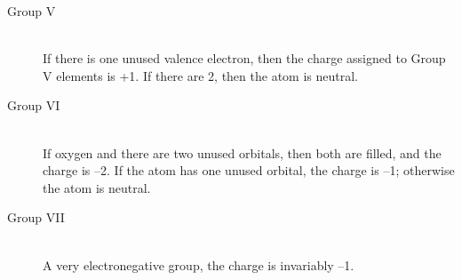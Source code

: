 \begin{description}
\begin{description}
\item[Group V]~\\
If there is one unused valence electron, then the charge assigned to Group V
elements is +1.  If there are 2, then the atom is neutral.

\item[Group VI]~\\
If oxygen  and there are two unused orbitals, then both are filled, and the
charge is --2.  If the atom has one unused orbital, the charge is --1;
otherwise the atom is neutral.

\item[Group VII]~\\
A very electronegative group, the charge is invariably --1.
\end{description}
\end{description}
